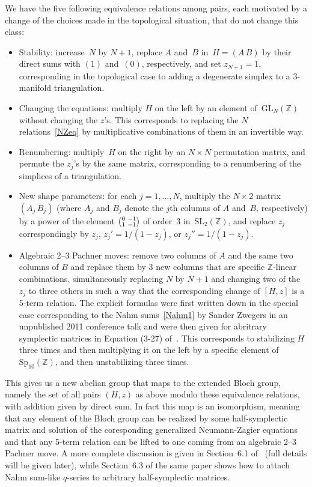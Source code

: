 \documentclass[12pt,reqno]{amsart}
\theoremstyle{definition}
\def\SL{\mathrm{SL}}
\def\GL{\mathrm{GL}}
\def\Sp{\mathrm{Sp}}
\def\Z{\mathbb Z}
\def\sma#1#2#3#4{\bigl(\smallmatrix#1&#2\\#3&#4\endsmallmatrix\bigr)}
\def\sma#1#2#3#4{\bigl(\!\smallmatrix#1&#2\\#3&#4\endsmallmatrix\!\bigr)}  %
\begin{document}
We have the five following equivalence relations among pairs, each motivated by a change of
the choices made in the topological situation, that do not change this class:
\begin{itemize}
\item Stability: increase~$N$ by $N+1$, replace $A$ and~$B$ in~$H=(A\,B)$ by their direct
sums with $(1)$ and~$(0)$, respectively, and set $z_{N+1}=1$, corresponding in the topological
case to adding a degenerate simplex to a 3-manifold triangulation.
\item Changing the equations: multiply $H$ on the left by an element of~$\GL_N(\Z)$ without
  changing the $z$'s.  This corresponds to replacing the $N$ relations~\eqref{NZeq} by
  multiplicative combinations of them in an invertible way.
\item  Renumbering: multiply~$H$ on the right  by an $N\times N$ permutation matrix, and
  permute the $z_j$'s by the same matrix, corresponding to a renumbering of the simplices of
  a triangulation. 
\item  New shape parameters: for each $j=1,\dots,N$, multiply the $N\times2$ matrix
  $(A_j\,B_j)$ (where $A_j$ and $B_j$ denote the $j$th columns of $A$ and~$B$, respectively)
  by a power of the element $\sma0{-1}1{-1}$ of order~3 in~$\SL_2(\Z)$, and replace $z_j$
  correspondingly by $z_j$, $z_j'=1/(1-z_j)$, or $z_j''=1/(1-z_j)$.
\item Algebraic 2--3 Pachner moves: remove two columns of $A$ and the same two columns of
  $B$ and replace them by 3 new columns that are specific $\Z$-linear combinations,
  simultaneously replacing $N$ by $N+1$ and changing two of the $z_j$ to three others in
  such a way that the corresponding change of $[H,z]$ is a 5-term relation.
  The explicit formulas were first written down in the special case corresponding to the
  Nahm sums~\eqref{Nahm1} by Sander Zwegers in an unpublished 2011 conference talk and were
  then given for abritrary symplectic matrices in Equation (3-27) of~\cite{DG}. This
  corresponds to stabilizing $H$ three times and then multiplying it on the left by a specific 
  element of~$\Sp_{10}(\Z)$, and then unstabilizing three times.
\end{itemize}
This gives us a new abelian group that maps to the extended Bloch group, namely the set of
all pairs $(H,z)$ as above modulo these equivalence relations, with addition given by
direct sum. In fact this map is an isomorphism, meaning that any element of the Bloch group
can be realized by some half-symplectic matrix and solution of the coresponding generalized
Neumann-Zagier equations and that any 5-term relation can be lifted to one coming from an
algebraic 2--3 Pachner move. A more complete discussion is given in Section~6.1
of~\cite{GZ:kashaev} (full details will be given later), while Section~6.3 of the same paper
shows how to attach Nahm sum-like $q$-series to arbitrary half-symplectic matrices.
\end{document}
